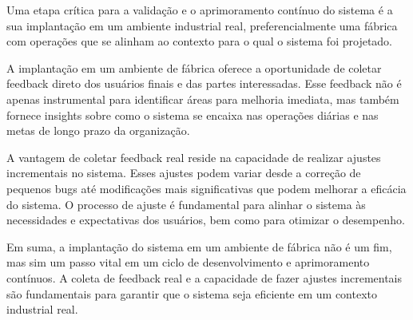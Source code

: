 Uma etapa crítica para a validação e o aprimoramento contínuo do sistema é a sua implantação em um ambiente industrial real, preferencialmente uma fábrica com operações que se alinham ao contexto para o qual o sistema foi projetado.

A implantação em um ambiente de fábrica oferece a oportunidade de coletar feedback direto dos usuários finais e das partes interessadas. Esse feedback não é apenas instrumental para identificar áreas para melhoria imediata, mas também fornece insights sobre como o sistema se encaixa nas operações diárias e nas metas de longo prazo da organização.

A vantagem de coletar feedback real reside na capacidade de realizar ajustes incrementais no sistema. Esses ajustes podem variar desde a correção de pequenos bugs até modificações mais significativas que podem melhorar a eficácia do sistema. O processo de ajuste é fundamental para alinhar o sistema às necessidades e expectativas dos usuários, bem como para otimizar o desempenho.


Em suma, a implantação do sistema em um ambiente de fábrica não é um fim, mas sim um passo vital em um ciclo de desenvolvimento e aprimoramento contínuos. A coleta de feedback real e a capacidade de fazer ajustes incrementais são fundamentais para garantir que o sistema seja eficiente em um contexto industrial real.










